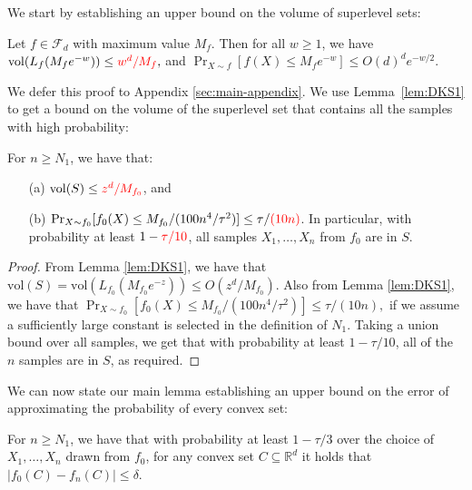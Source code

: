 \documentclass[final,12pt]{colt2018}
\newcommand{\nnew}[1]{{\color{red} #1}}
\newcommand{\nnew}[1]{#1}
\newtheorem{informal theorem}[theorem]{Theorem (informal statement)}
\newcommand{\R}{\mathbb{R}}
\newcommand{\vol}{\mathrm{vol}}
\begin{document}
We start by establishing an upper bound on the volume of superlevel sets:

\begin{lemma}\label{lem:DKS1}
Let $f \in \mathcal{F}_d$ with maximum value $M_f$. Then for all $w \geq 1$, we have
$
\vol(L_{f}(M_{f} e^{-w})) \leq \nnew{{w}^d / M_{f}},
$
and
$
\Pr_{X\sim f}[f(X) \leq M_{f} e^{-w}] \leq O(d)^d e^{-{w}/2}.
$
\end{lemma}

We defer this proof to Appendix \ref{sec:main-appendix}.
We use Lemma~\ref{lem:DKS1} to get a bound on the volume of the superlevel set that contains all the samples with high probability:

\begin{corollary}\label{lem:S_def}
For $n \geq N_1$, we have that:
\begin{itemize}
\item[(a)] $\vol(S) \leq \nnew{z^d / M_{f_0}}$, and 
\item[(b)] $\Pr_{X \sim f_0}[f_0(X) \leq M_{f_0}/(100 n^4  /\tau^2)] \leq \tau/\nnew{(10n)}$.
In particular, with probability at least $1-\nnew{\tau/10}$, all samples $X_1, \ldots, X_{n}$ from $f_0$ are in $S$.
\end{itemize}
\end{corollary}
\begin{proof}
From Lemma \ref{lem:DKS1}, we have that
$
\vol(S) = \vol(L_{f_0}(M_{f_0} e^{-z})) \leq O(z^d / M_{f_0}).
$
Also from Lemma \ref{lem:DKS1}, we have that
$
\Pr_{X \sim f_0}[f_0(X) \leq M_{f_0} / (100 n^4 /\tau^2)]  \leq \tau/(10n),
$
if we assume a sufficiently large constant is selected in the definition of $N_1$.
Taking a union bound over all samples, we get that with probability at least $1-\tau/10$, 
all of the $n$ samples are in $S$, as required.
\end{proof}


We can now state our main lemma establishing an upper bound
on the error of approximating the probability of every convex set:

\begin{lemma}\label{lem:alt_convex_set_prob}
For $n \geq N_1$, we have that 
with probability at least $1 - \tau/3$ over the choice of $X_1,\ldots,X_n$ drawn from $f_0$, 
for any convex set $C \subseteq \R^d$ it holds that
$\left|f_0(C) - f_n(C) \right| \leq \delta.$
\end{lemma}
\end{document}
